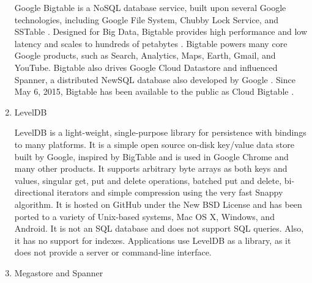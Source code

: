 \begin{enumerate}
Google Bigtable is a NoSQL database service, built upon several
Google technologies, including Google File System, Chubby Lock
Service, and SSTable \label{\detokenize{i524/technologies:id433}}{\hyperref[\detokenize{i524/technologies:www-cloudbigtable}]{\sphinxcrossref{{[}372{]}}}}.  Designed for Big
Data, Bigtable provides high performance and low latency and
scales to hundreds of petabytes
\label{\detokenize{i524/technologies:id434}}{\hyperref[\detokenize{i524/technologies:www-cloudbigtable}]{\sphinxcrossref{{[}372{]}}}}. Bigtable powers many core Google
products, such as Search, Analytics, Maps, Earth, Gmail, and
YouTube. Bigtable also drives Google Cloud Datastore and
influenced Spanner, a distributed NewSQL database also developed
by Google \label{\detokenize{i524/technologies:id435}}{\hyperref[\detokenize{i524/technologies:www-wikispanner}]{\sphinxcrossref{{[}373{]}}}} \label{\detokenize{i524/technologies:id436}}{\hyperref[\detokenize{i524/technologies:www-wikibigtable}]{\sphinxcrossref{{[}374{]}}}}.
Since May 6, 2015, Bigtable has been available to the public as
Cloud Bigtable \label{\detokenize{i524/technologies:id437}}{\hyperref[\detokenize{i524/technologies:www-wikibigtable}]{\sphinxcrossref{{[}374{]}}}}.

\item {} 
LevelDB

LevelDB is a light-weight, single-purpose library for persistence
with bindings to many platforms. \label{\detokenize{i524/technologies:id438}}{\hyperref[\detokenize{i524/technologies:www-leveldb}]{\sphinxcrossref{{[}375{]}}}} It is a
simple open source on-disk key/value data store built by Google,
inspired by BigTable and is used in Google Chrome and many other
products. It supports arbitrary byte arrays as both keys and
values, singular get, put and delete operations, batched put and
delete, bi-directional iterators and simple compression using the
very fast Snappy algorithm. It is hosted on GitHub under the New
BSD License and has been ported to a variety of Unix-based
systems, Mac OS X, Windows, and Android. It is not an SQL
database and does not support SQL queries. Also, it has no
support for indexes. Applications use LevelDB as a library, as it
does not provide a server or command-line interface.

\item {} 
Megastore and Spanner


\end{enumerate}
